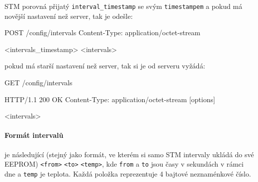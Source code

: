 STM porovná přijatý \texttt{interval\_timestamp} se svým \texttt{timestampem} a pokud má novější nastavení než server,
tak je odešle:
\begin{packetstm}
POST /config/intervals
Content-Type: application/octet-stream

<intervals_timestamp>
<intervals>
\end{packetstm}

pokud má starší nastavení než server, tak si je od serveru vyžádá:
\begin{packetstm}
GET /config/intervals
\end{packetstm}

\begin{packetserver}
HTTP/1.1 200 OK
Content-Type: application/octet-stream
[options]

<intervals>
\end{packetserver}

\paragraph{Formát intervalů}
je následující (stejný jako formát, ve kterém si samo STM intervaly ukládá do své EEPROM)
\texttt{<from>} \texttt{<to>} \texttt{<temp>}, kde \texttt{from} a \texttt{to} jsou
časy v sekundách v rámci dne a \texttt{temp} je teplota.
Každá položka reprezentuje 4 bajtové neznaménkové číslo.
